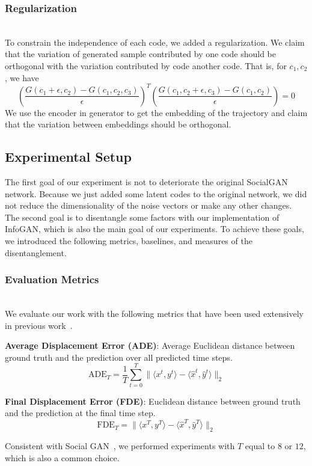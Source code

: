 \subsubsection{Regularization}
\hfill \\
To constrain the independence of each code, we added a regularization. We claim that the variation of generated sample contributed by one code should be orthogonal with the variation contributed by code another code. That is, for $c_1, c_2$, we have
  $$ (\frac {G(c_1 + \epsilon, c_2) - G(c_1, c_2, c_3)} {\epsilon})^T (\frac {G(c_1, c_2 + \epsilon, c_3) - G(c_1, c_2)} {\epsilon}) = 0$$
We use the encoder in generator to get the embedding of the trajectory and claim that the variation between embeddings should be orthogonal.


\subsection{Experimental Setup}
The first goal of our experiment is not to deteriorate the original SocialGAN network. Because we just added some latent codes to the original network, we did not reduce the dimensionality of the noise vectors or make any other changes. The second goal is to disentangle some factors with our implementation of InfoGAN, which is also the main goal of our experiments. To achieve these goals, we introduced the following metrics, baselines, and measures of the disentanglement.



\subsubsection{Evaluation Metrics}
\hfill \\
We evaluate our work with the following metrics that have been used extensively in previous work~\cite{Gupta_2018_CVPR, distant_prediction, Alahi16}.

\textbf{Average Displacement Error (ADE)}:  Average Euclidean distance between ground truth and the prediction over all predicted time steps.
$$\text{ADE}_{T} = \frac 1 T \sum_{t=0}^{T} \lVert \langle x^t, y^t \rangle - \langle \hat x^t, \hat y^t \rangle \lVert_{2} $$


\textbf{Final Displacement Error (FDE)}: Euclidean distance between ground truth and the prediction at the final time step.
$$\text{FDE}_{T} = \lVert \langle x^T, y^T \rangle - \langle \hat x^T, \hat y^T \rangle \lVert_{2}  $$

Consistent with Social GAN~\cite{Gupta_2018_CVPR}, we performed experiments with $T$ equal to $8$ or $12$, which is also a common choice.


